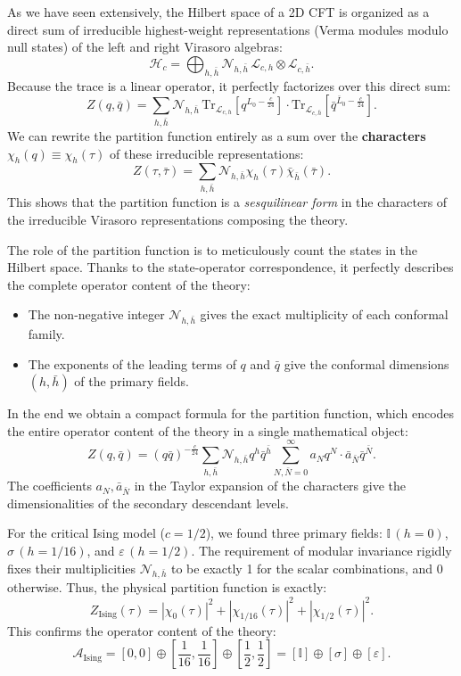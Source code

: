 As we have seen extensively, the Hilbert space of a 2D CFT is organized as a direct sum of irreducible highest-weight representations (Verma modules modulo null states) of the left and right Virasoro algebras:
\[
    \mathcal{H}_c = \bigoplus_{h, \bar{h}} \mathcal{N}_{h,\bar{h}} \, \mathcal{L}_{c,h} \otimes \mathcal{L}_{c,\bar{h}}.
\]
Because the trace is a linear operator, it perfectly factorizes over this direct sum:
\[
    Z(q, \bar{q}) = \sum_{h, \bar{h}} \mathcal{N}_{h,\bar{h}} \, \mathrm{Tr}_{\mathcal{L}_{c,h}} \left[ q^{L_0 - \frac{c}{24}} \right] \cdot \mathrm{Tr}_{\mathcal{L}_{c,\bar{h}}} \left[ \bar{q}^{\bar{L}_0 - \frac{c}{24}} \right].
\]
We can rewrite the partition function entirely as a sum over the \textbf{characters} \(\chi_h(q) \equiv \chi_h(\tau)\) of these irreducible representations:
\[
    Z(\tau, \bar{\tau}) = \sum_{h, \bar{h}} \mathcal{N}_{h,\bar{h}} \chi_h(\tau) \bar{\chi}_{\bar{h}}(\bar{\tau}).
\]
This shows that the partition function is a \textit{sesquilinear form} in the characters of the irreducible Virasoro representations composing the theory.

The role of the partition function is to meticulously count the states in the Hilbert space. Thanks to the state-operator correspondence, it perfectly describes the complete operator content of the theory:
\begin{itemize}
    \item The non-negative integer \(\mathcal{N}_{h,\bar{h}}\) gives the exact multiplicity of each conformal family.
    \item The exponents of the leading terms of \(q\) and \(\bar{q}\) give the conformal dimensions \((h, \bar{h})\) of the primary fields.
\end{itemize}

In the end we obtain a compact formula for the partition function, which encodes the entire operator content of the theory in a single mathematical object:
\[
    Z(q, \bar{q}) = (q \bar{q})^{-\frac{c}{24}} \sum_{h, \bar{h}} \mathcal{N}_{h,\bar{h}} q^h \bar{q}^{\bar{h}} \sum_{N, \bar{N}=0}^\infty a_N q^N \cdot \bar{a}_{\bar{N}} \bar{q}^{\bar{N}}.
\]
The coefficients \(a_N, \bar{a}_{\bar{N}}\) in the Taylor expansion of the characters give the dimensionalities of the secondary descendant levels.

\begin{example}
    For the critical Ising model (\(c = 1/2\)), we found three primary fields: \(\mathbb{I} \, (h=0)\), \(\sigma \, (h=1/16)\), and \(\varepsilon \, (h=1/2)\). The requirement of modular invariance rigidly fixes their multiplicities \(\mathcal{N}_{h,\bar{h}}\) to be exactly 1 for the scalar combinations, and 0 otherwise. Thus, the physical partition function is exactly:
    \[
        Z_{\mathrm{Ising}}(\tau) = |\chi_0(\tau)|^2 + |\chi_{1/16}(\tau)|^2 + |\chi_{1/2}(\tau)|^2.
    \]
    This confirms the operator content of the theory:
    \[
        \mathcal{A}_{\mathrm{Ising}} = [0,0] \oplus \left[\frac{1}{16}, \frac{1}{16}\right] \oplus \left[\frac{1}{2}, \frac{1}{2}\right] = [\mathbb{I}] \oplus [\sigma] \oplus [\varepsilon].
    \]
\end{example}

